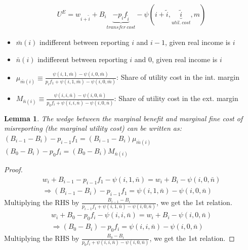 \documentclass[xcolor=pdftex,dvipsnames,table]{beamer}
\newtheorem{lemm}{Lemma}
\begin{document}
\begin{frame}[label=lemma]
\begin{align*}
U^E=w_{i+\tilde{i}}+B_{i}\underbrace{-p_if_{\tilde{i}}}_{transfer\ cost}-\psi(i+\tilde{i},\underbrace{\tilde{i}}_{util.\ cost}, m)
\end{align*} 
\begin{itemize}
\item   $\bar{m}(i)$ indifferent between reporting $i$ and $i-1$, given real income is $i$
\item  $\bar{n}(i)$ indifferent between reporting $i$ and $0$, given real income is $i$
\item $\mu_{\bar{m}(i)}\equiv \frac{\psi(i,1,\bar{m})-\psi(i,0,\bar{m})}{p_if_1+\psi(i,1,\bar{m})-\psi(i,0,\bar{m})}$: Share of utility cost in the int. margin
\item $M_{\bar{n}(i)}\equiv \frac{\psi(i,i,\bar{n})-\psi(i,0,\bar{n})}{p_0f_i+\psi(i,i,\bar{n})-\psi(i,0,\bar{n})}$: Share of utility cost in the ext. margin
\end{itemize}
\begin{lemm}
\label{lemma_mu}
The wedge between the marginal benefit and marginal fine cost of misreporting (the marginal utility cost) can be written as:\\
	$(B_{i-1}-B_i)-p_{i-1}f_1=(B_{i-1}-B_i)\mu_{\bar{m}(i)}$\\
	$(B_{0}-B_i)-p_0f_{i}=(B_{0}-B_i)M_{\bar{n}(i)}$\\ 
\end{lemm}
\end{frame}

\begin{frame}[label=proof_lemma]
\begin{proof}
\begin{align*}
w_i+B_{i-1}-p_{i-1}f_1-\psi(i,1,\bar{n})=w_i+B_i-\psi(i,0,\bar{n})\\
\Rightarrow (B_{i-1}-B_i)-p_{i-1}f_1= \psi(i,1,\bar{n})-\psi(i,0,\bar{n})
\end{align*}
Multiplying the RHS by $\frac{B_{i-1}-B_i}{p_{i-1}f_1+\psi(i,1,\bar{n})-\psi(i,0,\bar{n})}$, we get the 1st relation.
\begin{align*}
w_i+B_{0}-p_{0}f_i-\psi(i,i,\bar{n})=w_i+B_i-\psi(i,0,\bar{n})\\
\Rightarrow (B_{0}-B_i)-p_{0}f_i= \psi(i,i,\bar{n})-\psi(i,0,\bar{n})
\end{align*}
Multiplying the RHS by $\frac{B_{0}-B_i}{p_{0}f_i+\psi(i,i,\bar{n})-\psi(i,0,\bar{n})}$, we get the 1st relation.
\end{proof}
\hyperlink{prop_imp}{}
\end{frame}
\end{document}

